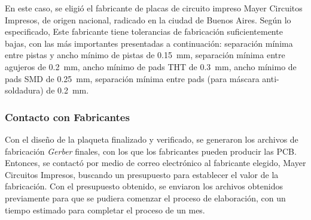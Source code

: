 En este caso, se eligió el fabricante de placas de circuito impreso Mayer Circuitos Impresos, de origen nacional, radicado en la ciudad de Buenos Aires. Según lo especificado, Este fabricante tiene tolerancias de fabricación suficientemente bajas, con las más importantes presentadas a continuación: separación mínima entre pistas y ancho mínimo de pistas de \SI[]{0.15}[]{\milli\metre}, separación mínima entre agujeros de \SI[]{0.2}[]{\milli\metre}, ancho mínimo de pads THT de \SI[]{0.3}[]{\milli\metre}, ancho mínimo de pads SMD de \SI[]{0.25}[]{\milli\metre}, separación mínima entre pads (para máscara anti-soldadura) de \SI[]{0.2}[]{\milli\metre}.\\

\subsubsection{Contacto con Fabricantes}
 
Con el diseño de la plaqueta finalizado y verificado, se generaron los archivos de fabricación \textit{Gerber} finales, con los que los fabricantes pueden producir las PCB. Entonces, se contactó por medio de correo electrónico al fabricante elegido, Mayer Circuitos Impresos, buscando un presupuesto para establecer el valor de la fabricación. Con el presupuesto obtenido, se enviaron los archivos obtenidos previamente para que se pudiera comenzar el proceso de elaboración, con un tiempo estimado para completar el proceso de un mes.\\